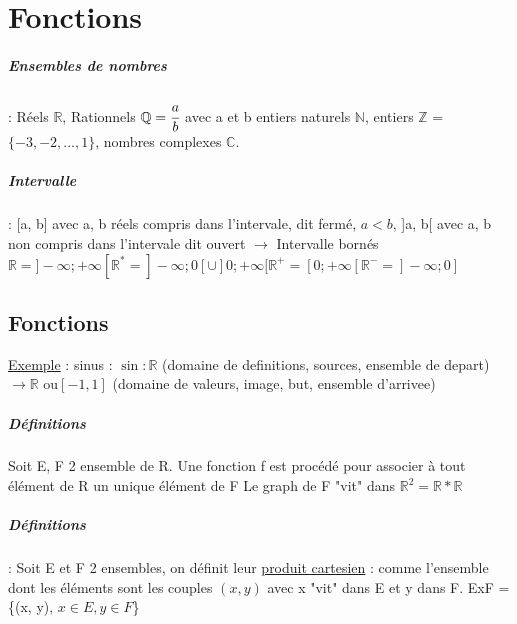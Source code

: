 \chapter{Fonctions}

\paragraph{Ensembles de nombres} : Réels $\mathbb{R}$, Rationnels $\mathbb{Q} = \cfrac{a}{b}$ avec a et b entiers naturels $\mathbb{N}$, entiers $\mathbb{Z}$ = $\{-3, -2, ..., 1\}$, nombres complexes $\mathbb{C}$.
\paragraph{Intervalle} : [a, b] avec a, b réels compris dans l'intervale, dit fermé, $a < b$, ]a, b[ avec a, b non compris dans l'intervale dit ouvert $\rightarrow$ Intervalle bornés
$\mathbb{R} = ]-\infty; +\infty[ \mathbb{R}^* = ]-\infty; 0[ \cup ]0; +\infty[ \mathbb{R}^+ = [0; +\infty[ \mathbb{R}^- = ]-\infty; 0]$

\section{Fonctions}
\ul{Exemple} : sinus : $\sin : \mathbb{R}$ (domaine de definitions, sources, ensemble de depart) $\rightarrow \mathbb{R}$ ou$ [-1, 1]$ (domaine de valeurs, image, but, ensemble d'arrivee)


\paragraph{Définitions} Soit E, F 2 ensemble de R. Une fonction f est procédé pour associer à tout élément de R un unique élément de F
Le graph de F "vit" dans $\mathbb{R}^2 = \mathbb{R}*\mathbb{R}$
\paragraph{Définitions} : Soit E et F 2 ensembles, on définit leur \ul{produit cartesien} :  comme l'ensemble dont les éléments sont les couples $(x, y)$ avec x "vit" dans E et y dans F. ExF = \{(x, y), $x \in E, y \in F$\}
